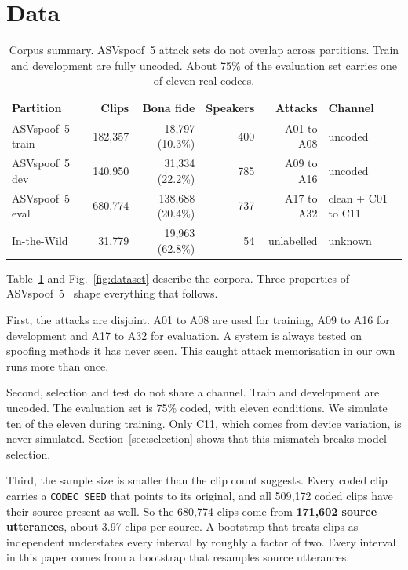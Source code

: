 \documentclass[twocolumn,a4paper,11pt]{article}
\begin{document}
\section{Data}
\label{sec:data}

\begin{table}[t]
\centering
\caption{Corpus summary. ASVspoof~5 attack sets do not overlap across
partitions. Train and development are fully uncoded. About 75\% of the
evaluation set carries one of eleven real codecs.}
\label{tab:data}
\small
\begin{tabular}{lrrrrl}
\toprule
Partition & Clips & Bona fide & Speakers & Attacks & Channel \\
\midrule
ASVspoof~5 train & 182{,}357 & 18{,}797 (10.3\%) & 400 & A01 to A08 & uncoded \\
ASVspoof~5 dev   & 140{,}950 & 31{,}334 (22.2\%) & 785 & A09 to A16 & uncoded \\
ASVspoof~5 eval  & 680{,}774 & 138{,}688 (20.4\%) & 737 & A17 to A32 & clean + C01 to C11 \\
In-the-Wild      &  31{,}779 &  19{,}963 (62.8\%) &  54 & unlabelled & unknown \\
\bottomrule
\end{tabular}
\end{table}

Table~\ref{tab:data} and Fig.~\ref{fig:dataset} describe the corpora. Three
properties of ASVspoof~5~\cite{asvspoof5} shape everything that follows.

First, the attacks are disjoint. A01 to A08 are used for training, A09 to A16
for development and A17 to A32 for evaluation. A system is always tested on
spoofing methods it has never seen. This caught attack memorisation in our own
runs more than once.

Second, selection and test do not share a channel. Train and development are
uncoded. The evaluation set is 75\% coded, with eleven conditions. We simulate
ten of the eleven during training. Only C11, which comes from device variation,
is never simulated. Section~\ref{sec:selection} shows that this mismatch breaks
model selection.

Third, the sample size is smaller than the clip count suggests. Every coded
clip carries a \texttt{CODEC\_SEED} that points to its original, and all
509{,}172 coded clips have their source present as well. So the 680{,}774
clips come from \textbf{171{,}602 source utterances}, about 3.97 clips per
source. A bootstrap that treats clips as independent understates every
interval by roughly a factor of two. Every interval in this paper comes from a
bootstrap that resamples source utterances.
\end{document}
